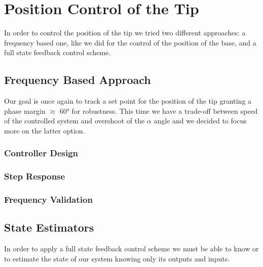 \chapter{Position Control of the Tip}
    \label{cha:position_tip}

    In order to control the position of the tip we tried two different approaches: a frequency based one, like we did for the control of the position of the base, and a full state feedback control scheme.

    \section{Frequency Based Approach}

        Our goal is once again to track a set point for the position of the tip granting a phase margin $\approx$ 60° for robustness. This time we have a trade-off between speed of the controlled system and overshoot of the $\alpha$ angle and we decided to focus more on the latter option.

        \subsection{Controller Design}


        \subsection{Step Response}


        \subsection{Frequency Validation}


    \section{State Estimators}

            In order to apply a full state feedback control scheme we must be able to know or to estimate the state of our system knowing only its outputs and inputs.

